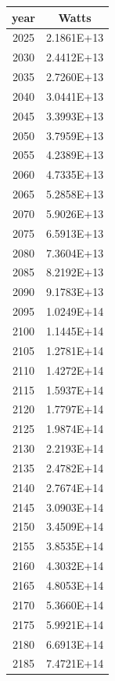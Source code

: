 \documentclass[a4paper]{article}
\begin{document}
	\pagebreak
	
	\small
	
	\noindent
	\begin{tabular}{|c|c|}
		\hline
		year & Watts \\
		\hline
		2025 & 2.1861E+13 \\
		\hline
		2030 & 2.4412E+13 \\
		\hline
		2035 & 2.7260E+13 \\
		\hline
		2040 & 3.0441E+13 \\
		\hline
		2045 & 3.3993E+13 \\
		\hline
		2050 & 3.7959E+13 \\
		\hline
		2055 & 4.2389E+13 \\
		\hline
		2060 & 4.7335E+13 \\
		\hline
		2065 & 5.2858E+13 \\
		\hline
		2070 & 5.9026E+13 \\
		\hline
		2075 & 6.5913E+13 \\
		\hline
		2080 & 7.3604E+13 \\
		\hline
		2085 & 8.2192E+13 \\
		\hline
		2090 & 9.1783E+13 \\
		\hline
		2095 & 1.0249E+14 \\
		\hline
		2100 & 1.1445E+14 \\
		\hline
		2105 & 1.2781E+14 \\
		\hline
		2110 & 1.4272E+14 \\
		\hline
		2115 & 1.5937E+14 \\
		\hline
		2120 & 1.7797E+14 \\
		\hline
		2125 & 1.9874E+14 \\
		\hline
		2130 & 2.2193E+14 \\
		\hline
		2135 & 2.4782E+14 \\
		\hline
		2140 & 2.7674E+14 \\
		\hline
		2145 & 3.0903E+14 \\
		\hline
		2150 & 3.4509E+14 \\
		\hline
		2155 & 3.8535E+14 \\
		\hline
		2160 & 4.3032E+14 \\
		\hline
		2165 & 4.8053E+14 \\
		\hline
		2170 & 5.3660E+14 \\
		\hline
		2175 & 5.9921E+14 \\
		\hline
		2180 & 6.6913E+14 \\
		\hline
		2185 & 7.4721E+14 \\

\end{tabular}
\end{document}
